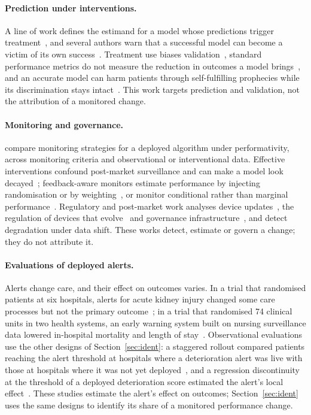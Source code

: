\documentclass[letterpaper]{article} %
\begin{document}
\paragraph{Prediction under interventions.} A line of work defines the estimand
for a model whose predictions trigger treatment~\citep{sperrin2018msm, vangeloven2020prediction, lin2021scoping,
keogh2024prediction, luijken2024estimands}, and several authors warn that a
successful model can become a victim of its own success~\citep{lenert2019victims,
sperrin2019explicit, balcarcel2025feedback}. Treatment use biases
validation~\citep{pajouheshnia2017accounting}, standard performance metrics do
not measure the reduction in outcomes a model brings~\citep{schuler2020performance},
and an accurate model can harm patients through self-fulfilling prophecies
while its discrimination stays intact~\citep{vanamsterdam2025selffulfilling}.
This work targets prediction and validation, not the attribution of a
monitored change.

\paragraph{Monitoring and governance.} \citet{feng2024designing} compare
monitoring strategies for a deployed algorithm under performativity, across
monitoring criteria and observational or interventional data. Effective
interventions confound post-market surveillance and can make a model look
decayed~\citep{ansari2025challenges}; feedback-aware monitors estimate
performance by injecting randomisation or by weighting~\citep{corbin2023avoiding,
kim2025monitoring}, or monitor conditional rather than marginal
performance~\citep{feng2024monitoring}. Regulatory and
post-market work analyses device updates~\citep{wu2024regulating}, the
regulation of devices that evolve~\citep{gonzalez2024regulating} and
governance infrastructure~\citep{afdideh2026aegis}, and
\citet{guan2026detecting} detect degradation under data shift.
These works detect, estimate or govern a change; they do not attribute it.

\paragraph{Evaluations of deployed alerts.} Alerts change care, and their effect on
outcomes varies. In a trial that randomised patients at six hospitals, alerts
for acute kidney injury changed some care processes but not the primary
outcome~\citep{wilson2021aki}; in a trial that randomised 74 clinical units in
two health systems, an early warning system built on nursing surveillance data
lowered in-hospital mortality and length of stay~\citep{rossetti2025concern}.
Observational evaluations use the other designs of Section~\ref{sec:ident}: a
staggered rollout compared patients reaching the alert threshold at hospitals
where a deterioration alert was live with those at hospitals where it was not
yet deployed~\citep{escobar2020automated}, and a regression discontinuity at
the threshold of a deployed deterioration score estimated the alert's local
effect~\citep{gallo2024effectiveness}. These studies estimate the alert's
effect on outcomes; Section~\ref{sec:ident} uses the same designs to identify
its share of a monitored performance change.
\end{document}
